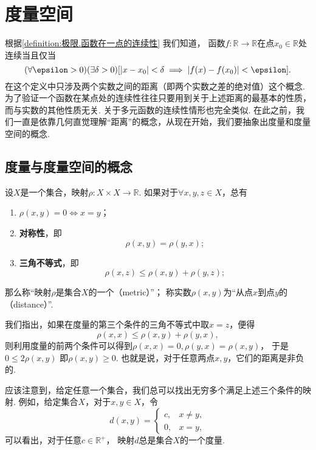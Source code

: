 \section{度量空间}
根据\cref{definition:极限.函数在一点的连续性} 我们知道，
函数\(f\colon\mathbb{R}\to\mathbb{R}\)在点\(x_0\in\mathbb{R}\)处连续当且仅当\[
	(\forall\epsilon>0)
	(\exists\delta>0)
	[
		\abs{x - x_0}<\delta
		\implies
		\abs{f(x) - f(x_0)} < \epsilon
	].
\]
在这个定义中只涉及两个实数之间的距离（即两个实数之差的绝对值）这个概念.
为了验证一个函数在某点处的连续性往往只要用到关于上述距离的最基本的性质，而与实数的其他性质无关.
关于多元函数的连续性情形也完全类似.
在此之前，我们一直是依靠几何直觉理解“距离”的概念，从现在开始，我们要抽象出度量和度量空间的概念.

\subsection{度量与度量空间的概念}
\begin{definition}
设\(X\)是一个集合，映射\(\rho\colon X \times X\to\mathbb{R}\).
如果对于\(\forall x,y,z \in X\)，总有\begin{enumerate}
	\item \(\rho(x,y)=0 \iff x=y\)；

	\item {\bf 对称性}，即\[
		\rho(x,y) = \rho(y,x);
	\]

	\item {\bf 三角不等式}，即\[
		\rho(x,z) \leq \rho(x,y) + \rho(y,z);
	\]
\end{enumerate}
那么称“映射\(\rho\)是集合\(X\)的一个（metric）”；
称实数\(\rho(x,y)\)为“从点\(x\)到点\(y\)的（distance）”.
\end{definition}

我们指出，如果在度量的第三个条件的三角不等式中取\(x=z\)，便得\[
	\rho(x,x)\leq\rho(x,y)+\rho(y,x),
\]
则利用度量的前两个条件可以得到\(\rho(x,x)=0,\rho(y,x)=\rho(x,y)\)，
于是\(0\leq2\rho(x,y)\)
即\(\rho(x,y)\geq0\).
也就是说，对于任意两点\(x,y\)，它们的距离是非负的.

应该注意到，给定任意一个集合，我们总可以找出无穷多个满足上述三个条件的映射.
例如，给定集合\(X\)，对于\(x,y \in X\)，令\[
	d(x,y) = \left\{ \begin{array}{cl}
		c, & x \neq y, \\
		0, & x=y,
	\end{array} \right.
\]
可以看出，对于任意\(c\in\mathbb{R}^+\)，
映射\(d\)总是集合\(X\)的一个度量.

